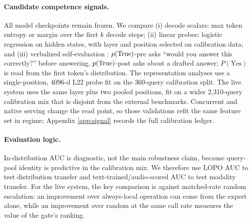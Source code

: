 \paragraph{Candidate competence signals.}
All model checkpoints remain frozen. We compare (i) decode scalars:
max token entropy or margin over the first $k$ decode steps; (ii)
linear probes: logistic regression on hidden states, with layer and
position selected on calibration data; and (iii) verbalized
self-evaluation
\citep{kadavath2022language}: $p(\mathrm{True})$-pre asks ``would you answer this
correctly?'' before answering, $p(\mathrm{True})$-post asks about a drafted
answer; $P(\text{Yes})$ is read from the first token's distribution.
The representation analyses use a single-position, 4096-d L22 probe
fit on the 360-query calibration split. The live system uses the same
layer plus two pooled positions, fit on a wider 2{,}310-query
calibration mix that is disjoint from the external benchmarks.
Concurrent and native serving change the read point, so those
validations refit the same feature set in regime; Appendix
\ref{app:signal} records the full calibration ledger.

\paragraph{Evaluation logic.}
In-distribution AUC is diagnostic, not the main robustness claim,
because query-pool identity is predictive in the calibration mix. We
therefore use LOPO AUC to test distribution transfer and
text-trained/audio-scored AUC to test modality transfer. For the live
system, the key comparison is against matched-rate random escalation:
an improvement over always-local operation can come from the expert
alone, while an improvement over random at the same call rate measures
the value of the gate's ranking.
